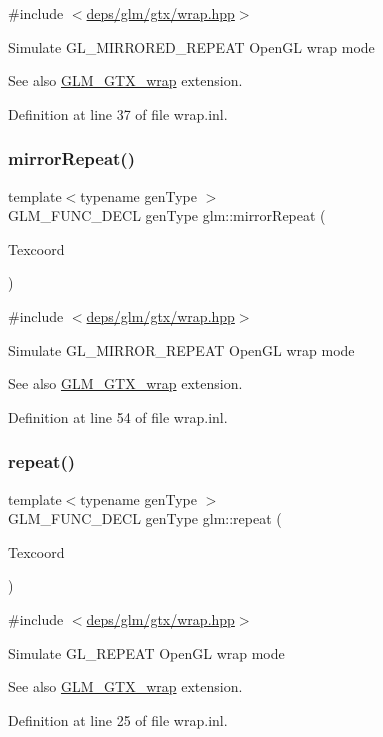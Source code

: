 {\ttfamily \#include $<$\hyperlink{wrap_8hpp}{deps/glm/gtx/wrap.\+hpp}$>$}

Simulate G\+L\+\_\+\+M\+I\+R\+R\+O\+R\+E\+D\+\_\+\+R\+E\+P\+E\+AT Open\+GL wrap mode \begin{DoxySeeAlso}{See also}
\hyperlink{group__gtx__wrap}{G\+L\+M\+\_\+\+G\+T\+X\+\_\+wrap} extension. 
\end{DoxySeeAlso}


Definition at line 37 of file wrap.\+inl.

\mbox{\label{group__gtx__wrap_ga16a89b0661b60d5bea85137bbae74d73}} 
\subsubsection{\texorpdfstring{mirror\+Repeat()}{mirrorRepeat()}}
{\footnotesize\ttfamily template$<$typename gen\+Type $>$ \\
G\+L\+M\+\_\+\+F\+U\+N\+C\+\_\+\+D\+E\+CL gen\+Type glm\+::mirror\+Repeat (\begin{DoxyParamCaption}\item[{gen\+Type const \&}]{Texcoord }\end{DoxyParamCaption})}



{\ttfamily \#include $<$\hyperlink{wrap_8hpp}{deps/glm/gtx/wrap.\+hpp}$>$}

Simulate G\+L\+\_\+\+M\+I\+R\+R\+O\+R\+\_\+\+R\+E\+P\+E\+AT Open\+GL wrap mode \begin{DoxySeeAlso}{See also}
\hyperlink{group__gtx__wrap}{G\+L\+M\+\_\+\+G\+T\+X\+\_\+wrap} extension. 
\end{DoxySeeAlso}


Definition at line 54 of file wrap.\+inl.

\mbox{\label{group__gtx__wrap_ga809650c6310ea7c42666e918c117fb6f}} 
\subsubsection{\texorpdfstring{repeat()}{repeat()}}
{\footnotesize\ttfamily template$<$typename gen\+Type $>$ \\
G\+L\+M\+\_\+\+F\+U\+N\+C\+\_\+\+D\+E\+CL gen\+Type glm\+::repeat (\begin{DoxyParamCaption}\item[{gen\+Type const \&}]{Texcoord }\end{DoxyParamCaption})}



{\ttfamily \#include $<$\hyperlink{wrap_8hpp}{deps/glm/gtx/wrap.\+hpp}$>$}

Simulate G\+L\+\_\+\+R\+E\+P\+E\+AT Open\+GL wrap mode \begin{DoxySeeAlso}{See also}
\hyperlink{group__gtx__wrap}{G\+L\+M\+\_\+\+G\+T\+X\+\_\+wrap} extension. 
\end{DoxySeeAlso}


Definition at line 25 of file wrap.\+inl.

